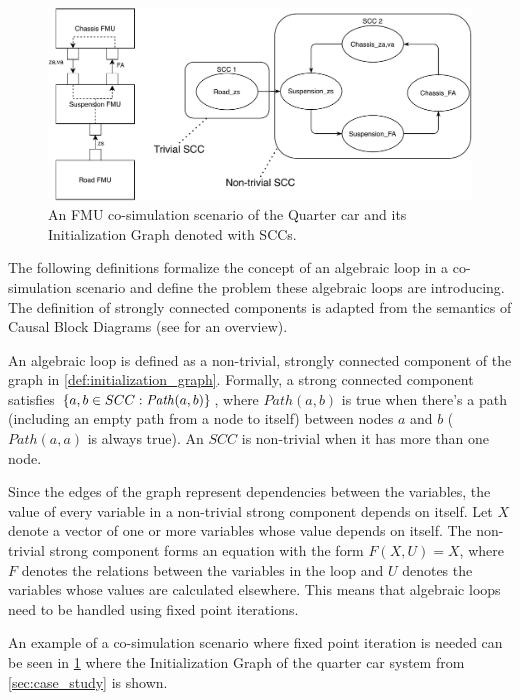 \begin{figure}
    \centering
    \includegraphics[width=1\textwidth]{images/quarter_car_SCC.pdf}
    \caption{An FMU co-simulation scenario of the Quarter car and its Initialization Graph denoted with SCCs.}
    \label{fig:fmu_cycle}
\end{figure}

The following definitions formalize the concept of an algebraic loop in a co-simulation scenario and define the problem these algebraic loops are introducing.
The definition of strongly connected components is adapted from the semantics of Causal Block Diagrams (see \cite{Gomes2020} for an overview).

\begin{definition} \label{def:loop}
An algebraic loop is defined as a non-trivial, strongly connected component of the graph in \cref{def:initialization_graph}.
Formally, a strong connected component satisfies $ \left\{ a,b \in SCC: \mathit{Path}(a,b) \right\}$, where $\mathit{Path}(a,b)$ is true when there's a path (including an empty path from a node to itself) between nodes $a$ and $b$ ($\mathit{Path}(a,a)$ is always true).
An $SCC$ is non-trivial when it has more than one node.
\end{definition}

Since the edges of the graph represent dependencies between the variables, the value of every variable in a non-trivial strong component depends on itself.
Let $X$ denote a vector of one or more variables whose value depends on itself. The non-trivial strong component forms an equation with the form $F(X, U) = X$, where $F$ denotes the relations between the variables in the loop and $U$ denotes the variables whose values are calculated elsewhere. 
This means that algebraic loops need to be handled using fixed point iterations\cite{Gomes2018}. 

An example of a co-simulation scenario where fixed point iteration is needed can be seen in \cref{fig:fmu_cycle} where the Initialization Graph of the quarter car system from \cref{sec:case_study} is shown.

